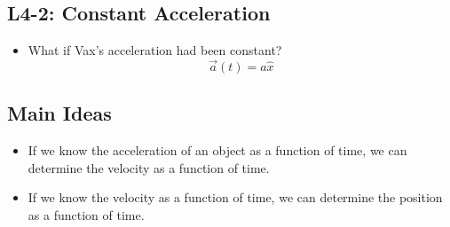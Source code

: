 \documentclass[]{article}
\begin{document}
\begin{PresentSpace}
\vspace{-10pt}
\section*{L4-2: Constant Acceleration}
\vspace{-10pt}
\begin{itemize}
	\item What if Vax's acceleration had been constant?
	\[
	\vec{a}(t) = a\hat{x}
	\]
\end{itemize}
\end{PresentSpace}
\newpage
\begin{TeacherMargin}

\end{TeacherMargin}
\begin{PresentSpace}
\section*{Main Ideas}
\begin{itemize}
	\item If we know the acceleration of an object as a function of time, we can determine the velocity as a function of time.
	\item If we know the velocity as a function of time, we can determine the position as a function of time.
\end{itemize}
\end{PresentSpace}
\end{document}
